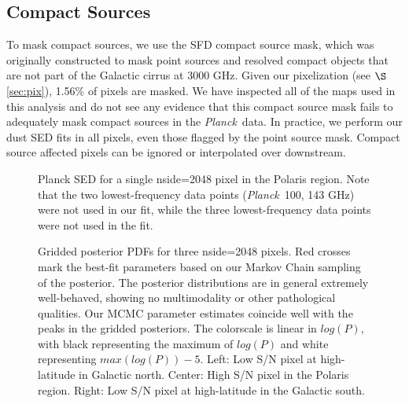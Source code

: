 \documentclass{emulateapj}
\newcommand{\PLANCK}{{\it Planck}}
\begin{document}

\subsection{Compact Sources}
To mask compact sources, we use the SFD compact source mask, which was 
originally constructed to mask point sources and resolved compact objects
that are not part of the Galactic cirrus at 3000 GHz. Given our pixelization 
(see $\S$\ref{sec:pix}), 1.56\% of pixels are masked. We have inspected all of 
the maps used in this analysis and do not see any evidence that this compact 
source mask fails to adequately mask compact sources in the \PLANCK~data. In 
practice, we perform our dust SED fits in all pixels, even those flagged by 
the point source mask. Compact source affected pixels can be ignored or 
interpolated over downstream.

\begin{figure}
\begin{center}
\caption{\label{fig:sed} Planck SED for a single nside=2048 pixel in the 
Polaris region. Note that the two lowest-frequency data points (\PLANCK~100, 
143 GHz) were not used in our fit, while the three lowest-frequency data
points were not used in the \cite{planckdust} fit.}
\end{center}
\end{figure}

\begin{figure*}
\begin{center}
\caption{Gridded posterior PDFs for three nside=2048 pixels. Red crosses mark 
the best-fit parameters based on our Markov Chain sampling of the posterior. 
The posterior distributions are in general extremely well-behaved, showing
no multimodality or other pathological qualities. Our MCMC parameter 
estimates coincide well with the peaks in the gridded posteriors. The 
colorscale is linear in $log(P)$, with black representing the maximum of 
$log(P)$ and white representing $max(log(P))-5$. Left: Low S/N pixel at 
high-latitude in Galactic north. Center: High S/N pixel in the Polaris region. 
Right: Low S/N pixel at high-latitude in the Galactic south.}
\end{center}
\end{figure*}
\end{document}
